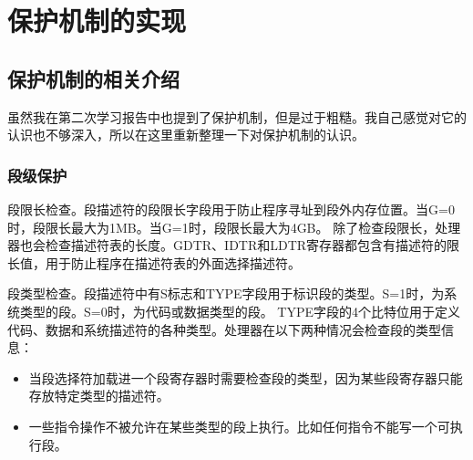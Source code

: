 \documentclass[a4paper,left=2.5cm,right=2.5cm,11pt]{article}
\begin{document}
\clearpage

\section{保护机制的实现}
\subsection{保护机制的相关介绍}
	虽然我在第二次学习报告中也提到了保护机制，但是过于粗糙。我自己感觉对它的认识也不够深入，所以在这里重新整理一下对保护机制的认识。\par
\subsubsection{段级保护}
	段限长检查。段描述符的段限长字段用于防止程序寻址到段外内存位置。当G=0时，段限长最大为1MB。当G=1时，段限长最大为4GB。
	除了检查段限长，处理器也会检查描述符表的长度。GDTR、IDTR和LDTR寄存器都包含有描述符的限长值，用于防止程序在描述符表的外面选择描述符。\par
	段类型检查。段描述符中有S标志和TYPE字段用于标识段的类型。S=1时，为系统类型的段。S=0时，为代码或数据类型的段。
	TYPE字段的4个比特位用于定义代码、数据和系统描述符的各种类型。处理器在以下两种情况会检查段的类型信息：
	\begin{itemize}
		\item 当段选择符加载进一个段寄存器时需要检查段的类型，因为某些段寄存器只能存放特定类型的描述符。
		\item 一些指令操作不被允许在某些类型的段上执行。比如任何指令不能写一个可执行段。
	\end{itemize}
\end{document}
